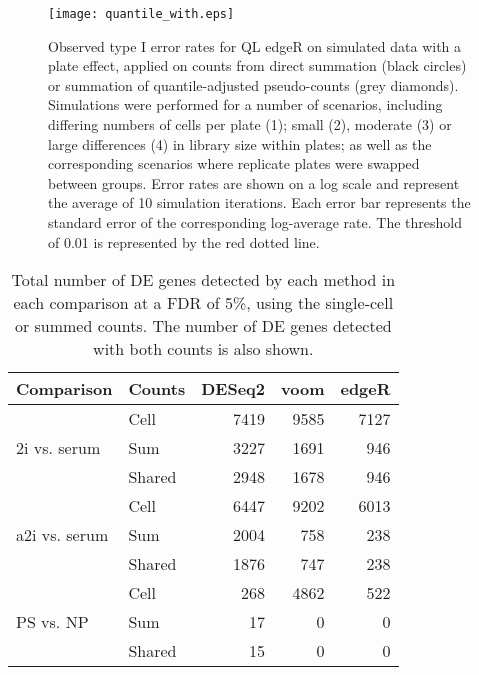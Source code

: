 \documentclass[oupdraft]{bio}
\begin{document}
\begin{figure}[!p]
\begin{center}
\texttt{[image: quantile\_with.eps]}
\end{center}
\caption{
    Observed type I error rates for QL edgeR on simulated data with a plate effect, 
        applied on counts from direct summation (black circles) or summation of quantile-adjusted pseudo-counts (grey diamonds). 
    Simulations were performed for a number of scenarios, including differing numbers of cells per plate (1);
        small (2), moderate (3) or large differences (4) in library size within plates;
        as well as the corresponding scenarios where replicate plates were swapped between groups.
    Error rates are shown on a log scale and represent the average of 10 simulation iterations.
    Each error bar represents the standard error of the corresponding log-average rate.
    The threshold of 0.01 is represented by the red dotted line.
}
\label{fig:complexplate}
\end{figure}


\begin{table}[!p]
\caption{Total number of DE genes detected by each method in each comparison at a FDR of 5\%, using the single-cell or summed counts.
The number of DE genes detected with both counts is also shown.
}
\label{tab:realnum}
\begin{center}
\begin{tabular}{l l r r r}
\hline
\textbf{Comparison} & \textbf{Counts} & \textbf{DESeq2} & \textbf{voom} & \textbf{edgeR} \\
\hline
\multirow{3}{*}{2i vs. serum} 
& Cell & 7419 & 9585 & 7127 \\
& Sum & 3227 & 1691 & 946 \\
& Shared & 2948 & 1678 & 946 \\
\hline
\multirow{3}{*}{a2i vs. serum} 
& Cell & 6447 & 9202 & 6013 \\
& Sum & 2004 & 758 & 238 \\
& Shared & 1876 & 747 & 238 \\
\hline
\multirow{3}{*}{PS vs. NP} 
& Cell & 268 & 4862 & 522 \\
& Sum & 17 & 0 & 0 \\
& Shared & 15 & 0 & 0 \\
\hline
\end{tabular}
\end{center}
\end{table}
\end{document}
